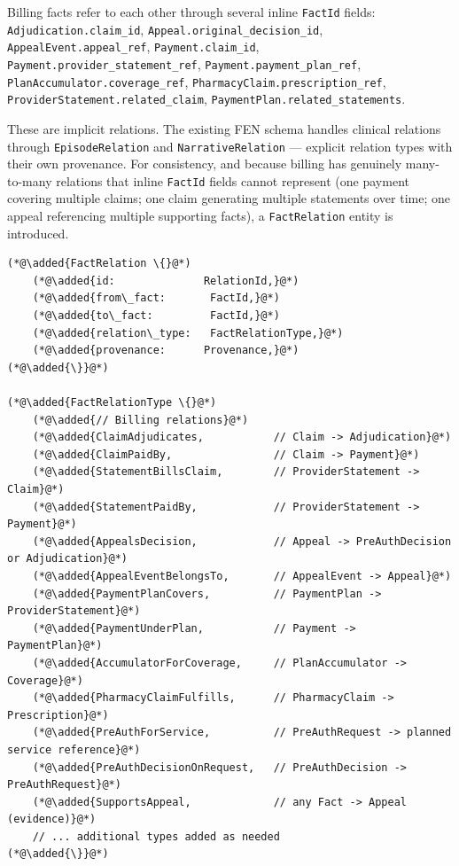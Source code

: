 \documentclass[11pt]{article}
\newcommand{\added}[1]{\textcolor{accentblue}{#1}}
\begin{document}
Billing facts refer to each other through several inline
\texttt{FactId} fields: \texttt{Adjudication.claim\_id},
\texttt{Appeal.original\_decision\_id},
\texttt{AppealEvent.appeal\_ref},
\texttt{Payment.claim\_id},
\texttt{Payment.provider\_statement\_ref},
\texttt{Payment.payment\_plan\_ref},
\texttt{PlanAccumulator.coverage\_ref},
\texttt{PharmacyClaim.prescription\_ref},
\texttt{ProviderStatement.related\_claim},
\texttt{PaymentPlan.related\_statements}.

These are implicit relations. The existing FEN schema handles
clinical relations through \texttt{EpisodeRelation} and
\texttt{NarrativeRelation} --- explicit relation types with their own
provenance. For consistency, and because billing has genuinely
many-to-many relations that inline \texttt{FactId} fields cannot
represent (one payment covering multiple claims; one claim generating
multiple statements over time; one appeal referencing multiple
supporting facts), a \texttt{FactRelation} entity is introduced.

\begin{lstlisting}
(*@\added{FactRelation \{}@*)
    (*@\added{id:              RelationId,}@*)
    (*@\added{from\_fact:       FactId,}@*)
    (*@\added{to\_fact:         FactId,}@*)
    (*@\added{relation\_type:   FactRelationType,}@*)
    (*@\added{provenance:      Provenance,}@*)
(*@\added{\}}@*)

(*@\added{FactRelationType \{}@*)
    (*@\added{// Billing relations}@*)
    (*@\added{ClaimAdjudicates,           // Claim -> Adjudication}@*)
    (*@\added{ClaimPaidBy,                // Claim -> Payment}@*)
    (*@\added{StatementBillsClaim,        // ProviderStatement -> Claim}@*)
    (*@\added{StatementPaidBy,            // ProviderStatement -> Payment}@*)
    (*@\added{AppealsDecision,            // Appeal -> PreAuthDecision or Adjudication}@*)
    (*@\added{AppealEventBelongsTo,       // AppealEvent -> Appeal}@*)
    (*@\added{PaymentPlanCovers,          // PaymentPlan -> ProviderStatement}@*)
    (*@\added{PaymentUnderPlan,           // Payment -> PaymentPlan}@*)
    (*@\added{AccumulatorForCoverage,     // PlanAccumulator -> Coverage}@*)
    (*@\added{PharmacyClaimFulfills,      // PharmacyClaim -> Prescription}@*)
    (*@\added{PreAuthForService,          // PreAuthRequest -> planned service reference}@*)
    (*@\added{PreAuthDecisionOnRequest,   // PreAuthDecision -> PreAuthRequest}@*)
    (*@\added{SupportsAppeal,             // any Fact -> Appeal (evidence)}@*)
    // ... additional types added as needed
(*@\added{\}}@*)
\end{lstlisting}
\end{document}
